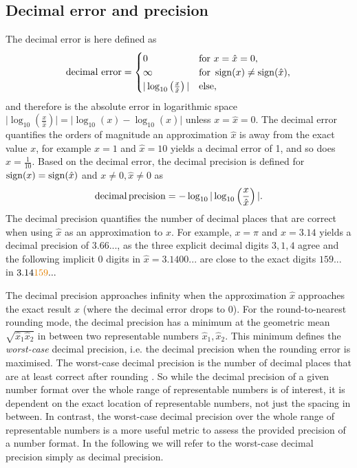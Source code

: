 \subsection{Decimal error and precision}
\label{sec:decimal_precision}

The decimal error is here defined as
\begin{equation}
	\text{decimal error} = \begin{cases}
						0 &\text{for } x = \hat{x} = 0, \\
						\infty &\text{for } \operatorname{sign}(x) \neq \operatorname{sign}(\hat{x}), \\
						\vert \log_{10}\left( \frac{x}{\hat{x}} \right) \vert &\text{else},
					\end{cases}
	\label{eq:decerror}
\end{equation}
and therefore is the absolute error in logarithmic space
$\vert \log_{10}(\tfrac{x}{\hat{x}}) \vert = \vert \log_{10}(x) - \log_{10}(\hat{x}) \vert$ unless $x = \hat{x} = 0$.
The decimal error quantifies the orders of magnitude an approximation $\hat{x}$ is away from the exact value $x$,
for example $x = 1$ and $\hat{x} = 10$ yields a decimal error of 1, and so does $\hat{x} = \tfrac{1}{10}$. Based on
the decimal error, the decimal precision is defined for $\operatorname{sign}(x) = \operatorname{sign}(\hat{x})$ and $x \neq 0, \hat{x} \neq 0$ 
as \citep{Gustafson2017a,Klower2019a}
\begin{equation}
\operatorname{decimal} \operatorname{precision} = -\log_{10} \vert \log_{10} \left( \frac{x}{\hat{x}} \right) \vert.
\end{equation}
The decimal precision quantifies the number of decimal places that are correct when using $\hat{x}$ as an approximation
to $x$. For example, $x = \pi$ and $\hat{x} = 3.14$ yields a decimal precision of $3.66...$, as the three explicit decimal
digits $3,1,4$ agree and the following implicit 0 digits in $\hat{x} = 3.1400...$ are close to the exact digits $159...$ in $3.14{\color{pregime}159}...$

The decimal precision approaches infinity when the approximation $\hat{x}$ approaches the exact result $x$ (where the
decimal error drops to 0). For the round-to-nearest rounding mode, the decimal precision has a minimum
at the geometric mean $\sqrt{\hat{x}_1\hat{x}_2}$ in between two representable numbers $\hat{x}_1,\hat{x}_2$. 
This minimum defines the \emph{worst-case} decimal precision, i.e. the decimal precision when the rounding error
is maximised. The worst-case decimal precision is the number of decimal places that are at least correct after rounding
\citep{Gustafson2017a}. So while the decimal precision of a given number format over the whole
range of representable numbers is of interest, it is dependent on the exact location of representable numbers, not just
the spacing in between. In contrast, the worst-case decimal precision over the whole range of representable numbers
is a more useful metric to assess the provided precision of a number format. In the following we will refer to the
worst-case decimal precision simply as decimal precision.

